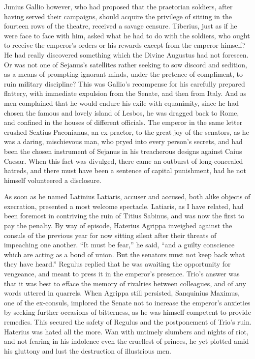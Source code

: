 
Junius Gallio however, who had proposed that the praetorian soldiers, after having served their campaigns, should acquire the privilege of sitting in the fourteen rows of the theatre, received a savage censure. Tiberius, just as if he were face to face with him, asked what he had to do with the soldiers, who ought to receive the emperor's orders or his rewards except from the emperor himself? He had really discovered something which the Divine Augustus had not foreseen. Or was not one of Sejanus's satellites rather seeking to sow discord and sedition, as a means of prompting ignorant minds, under the pretence of compliment, to ruin military discipline? This was Gallio's recompense for his carefully prepared flattery, with immediate expulsion from the Senate, and then from Italy. And as men complained that he would endure his exile with equanimity, since he had chosen the famous and lovely island of Lesbos, he was dragged back to Rome, and confined in the houses of different officials. The emperor in the same letter crushed Sextius Paconianus, an ex-praetor, to the great joy of the senators, as he was a daring, mischievous man, who pryed into every person's secrets, and had been the chosen instrument of Sejanus in his treacherous designs against Caius Caesar. When this fact was divulged, there came an outburst of long-concealed hatreds, and there must have been a sentence of capital punishment, had he not himself volunteered a disclosure.


As soon as he named Latinius Latiaris, accuser and accused, both alike objects of execration, presented a most welcome spectacle. Latiaris, as I have related, had been foremost in contriving the ruin of Titius Sabinus, and was now the first to pay the penalty. By way of episode, Haterius Agrippa inveighed against the consuls of the previous year for now sitting silent after their threats of impeaching one another. ``It must be fear,'' he said, ``and a guilty conscience which are acting as a bond of union. But the senators must not keep back what they have heard.'' Regulus replied that he was awaiting the opportunity for vengeance, and meant to press it in the emperor's presence. Trio's answer was that it was best to efface the memory of rivalries between colleagues, and of any words uttered in quarrels. When Agrippa still persisted, Sanquinius Maximus, one of the ex-consuls, implored the Senate not to increase the emperor's anxieties by seeking further occasions of bitterness, as he was himself competent to provide remedies. This secured the safety of Regulus and the postponement of Trio's ruin. Haterius was hated all the more. Wan with untimely slumbers and nights of riot, and not fearing in his indolence even the cruellest of princes, he yet plotted amid his gluttony and lust the destruction of illustrious men.


